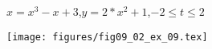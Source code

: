 {$x=x^3-x+3$,\quad $y=2*x^2+1$,\quad $-2\leq t \leq 2$}{\begin{minipage}{\linewidth}
\texttt{[image: figures/fig09\_02\_ex\_09.tex]}\end{minipage}
}